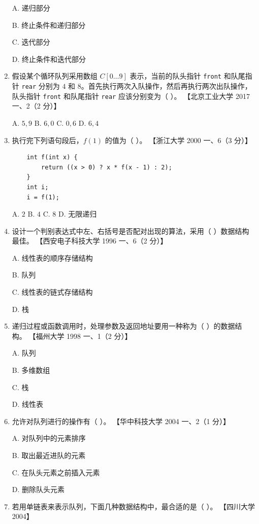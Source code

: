 \documentclass[lang=cn,newtx,10pt,scheme=chinese]{../../elegantbook}
\begin{document}
\begin{enumerate}
    A. 递归部分  

    B. 终止条件和递归部分  

    C. 迭代部分  

    D. 终止条件和迭代部分  

    \item 假设某个循环队列采用数组 $C[0 \ldots 9]$ 表示，当前的队头指针 \texttt{front} 和队尾指针 \texttt{rear} 分别为 $4$ 和 $8$。首先执行两次入队操作，然后再执行两次出队操作，队头指针 \texttt{front} 和队尾指针 \texttt{rear} 应该分别变为（ ）。  
    【北京工业大学 2017 一、2（2 分）】  

    A. $5, 9$ \quad B. $6, 0$ \quad C. $0, 6$ \quad D. $6, 4$  

    \item 执行完下列语句段后，$f(1)$ 的值为（ ）。  
    【浙江大学 2000 一、6（3 分）】  

    \begin{verbatim}
    int f(int x) {
        return ((x > 0) ? x * f(x - 1) : 2);
    }
    int i;
    i = f(1);
    \end{verbatim}

    A. $2$ \quad B. $4$ \quad C. $8$ \quad D. 无限递归  

    \item 设计一个判别表达式中左、右括号是否配对出现的算法，采用（ ）数据结构最佳。  
    【西安电子科技大学 1996 一、6（2 分）】  

    A. 线性表的顺序存储结构  

    B. 队列  


    C. 线性表的链式存储结构  

    D. 栈  

    \item 递归过程或函数调用时，处理参数及返回地址要用一种称为（ ）的数据结构。  
    【福州大学 1998 一、1（2 分）】  

    A. 队列  

    B. 多维数组  

    C. 栈  

    D. 线性表  

    \item 允许对队列进行的操作有（ ）。  
    【华中科技大学 2004 一、2（1 分）】  

    A. 对队列中的元素排序  

    B. 取出最近进队的元素  

    C. 在队头元素之前插入元素  

    D. 删除队头元素  

    \item 若用单链表来表示队列，下面几种数据结构中，最合适的是（ ）。  
    【四川大学 2004】  


\end{enumerate}
\end{document}
